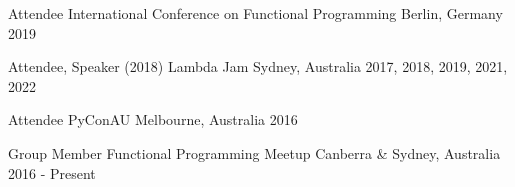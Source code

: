 


\begin{cventries}


\cventry
{Attendee} %
{International Conference on Functional Programming} %
{Berlin, Germany} %
{2019} %
{ %
\begin{cvitems}
\end{cvitems}
}
{}

\vspace{-7.5mm}


\cventry
{Attendee, Speaker (2018)} %
{Lambda Jam} %
{Sydney, Australia} %
{2017, 2018, 2019, 2021, 2022} %
{ %
\begin{cvitems}
\end{cvitems}
}
{}

\vspace{-7.5mm}


\cventry
{Attendee} %
{PyConAU} %
{Melbourne, Australia} %
{2016} %
{ %
\begin{cvitems}
\end{cvitems}
}
{}

\vspace{-7.5mm}


\cventry
{Group Member} %
{Functional Programming Meetup} %
{Canberra \& Sydney, Australia} %
{2016 - Present} %
{ %
\begin{cvitems}
\end{cvitems}
}
{}


\end{cventries}
